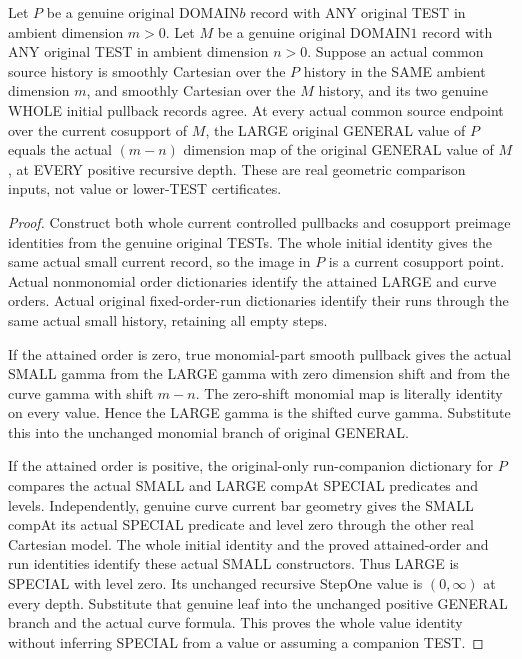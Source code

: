 \begin{theorem}
\label{hir:original-large-full-values-via-actual-local-curve-model}
\leanok
Let $P$ be a genuine original DOMAIN$b$ record with ANY original TEST in
ambient dimension $m>0$. Let $M$ be a genuine original DOMAIN$1$ record with
ANY original TEST in ambient dimension $n>0$. Suppose an actual common
source history is smoothly Cartesian over the $P$ history in the SAME
ambient dimension $m$, and smoothly Cartesian over the $M$ history, and
its two genuine WHOLE initial pullback records agree. At every actual common
source endpoint over the current cosupport of $M$, the LARGE original
GENERAL value of $P$ equals the actual $(m-n)$ dimension map of the original
GENERAL value of $M$, at EVERY positive recursive depth. These are real
geometric comparison inputs, not value or lower-TEST certificates.
\end{theorem}
\begin{proof}
Construct both whole current controlled pullbacks and cosupport preimage
identities from the genuine original TESTs. The whole initial identity gives
the same actual small current record, so the image in $P$ is a current
cosupport point. Actual nonmonomial order dictionaries identify the attained
LARGE and curve orders. Actual original fixed-order-run dictionaries identify
their runs through the same actual small history, retaining all empty steps.

If the attained order is zero, true monomial-part smooth pullback gives the
actual SMALL gamma from the LARGE gamma with zero dimension shift and from
the curve gamma with shift $m-n$. The zero-shift monomial map is literally
identity on every value. Hence the LARGE gamma is the shifted curve gamma.
Substitute this into the unchanged monomial branch of original GENERAL.

If the attained order is positive, the original-only run-companion dictionary
for $P$ compares the actual SMALL and LARGE compAt SPECIAL predicates and
levels. Independently, genuine curve current bar geometry gives the SMALL
compAt its actual SPECIAL predicate and level zero through the other real
Cartesian model. The whole initial identity and the proved attained-order
and run identities identify these actual SMALL constructors. Thus LARGE is
SPECIAL with level zero. Its unchanged recursive StepOne value is $(0,\infty)$
at every depth. Substitute that genuine leaf into the unchanged positive
GENERAL branch and the actual curve formula. This proves the whole value
identity without inferring SPECIAL from a value or assuming a companion TEST.
\end{proof}

